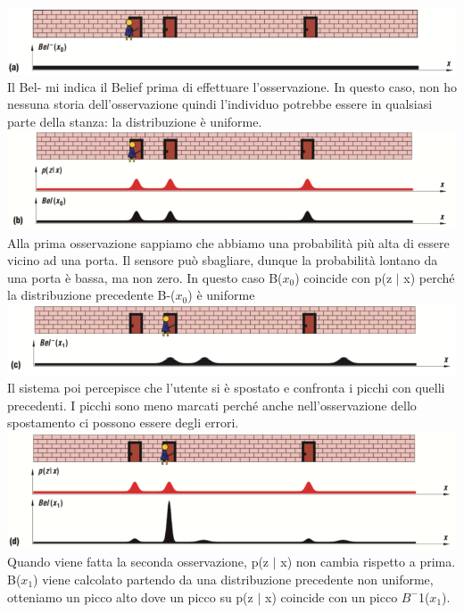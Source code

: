 \includegraphics[width=\textwidth]{images/MobiDEV/2. tecniche di aggregazione di dati soggetti a rumore/modello percettivo 1.PNG} \\
Il Bel- mi indica il Belief prima di effettuare l’osservazione. In questo caso, non ho nessuna storia dell’osservazione quindi l’individuo potrebbe essere in qualsiasi parte della stanza: la distribuzione è uniforme. \\
\includegraphics[width=\textwidth]{images/MobiDEV/2. tecniche di aggregazione di dati soggetti a rumore/modello percettivo 2.PNG}
Alla prima osservazione sappiamo che abbiamo una probabilità più alta di essere vicino ad una porta. Il sensore può sbagliare, dunque la probabilità lontano da una porta è bassa, ma non zero.
In questo caso B($x_0$) coincide con p(z $|$ x) perché la distribuzione precedente B-($x_0$) è uniforme \\
\includegraphics[width=\textwidth]{images/MobiDEV/2. tecniche di aggregazione di dati soggetti a rumore/modello percettivo 3.PNG}
Il sistema poi percepisce che l'utente si è spostato e confronta i picchi con quelli precedenti. I picchi sono meno marcati perché anche nell'osservazione dello spostamento ci possono essere degli errori. \\
\includegraphics[width=\textwidth]{images/MobiDEV/2. tecniche di aggregazione di dati soggetti a rumore/modello percettivo 4.PNG}
Quando viene fatta la seconda osservazione, p(z $|$ x) non cambia rispetto a prima.
\\ B($x_1$) viene calcolato partendo da una distribuzione precedente non uniforme, otteniamo un picco alto dove un picco su p(z $|$ x) coincide con un picco $B^-$1($x_1$).

